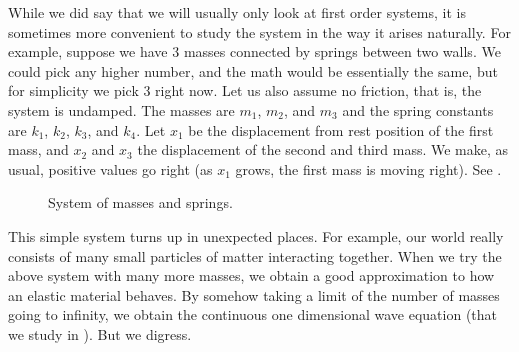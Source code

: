 \documentclass[12pt]{book}
\begin{document}
While we did say that we will usually only look at first order systems, it is
sometimes more convenient to study the system in the way it arises naturally.
For example, suppose we have 3 masses connected by springs between two
walls.  We could pick any higher number, and the math would be essentially
the same, but for simplicity we pick 3 right now.  Let us also assume no
friction, that is, the system is undamped.
The masses are $m_1$, $m_2$, and
$m_3$ and the spring constants are $k_1$, $k_2$, $k_3$, and $k_4$.
Let $x_1$ be the displacement from rest position of the first mass, and
$x_2$ and $x_3$ the displacement of the second and third mass.  We make,
as usual, positive values go right (as $x_1$ grows, the first mass is
moving right).
See .

\begin{figure}[h!t]
\capstart
\begin{center}
\caption{System of masses and springs.\label{sosa:threecartsfig}}
\end{center}
\end{figure}

This simple system turns up in unexpected places.  For example, 
our world really consists of many small particles of matter interacting together.
When we try the above system with many more masses, we obtain a good approximation to
how an elastic material behaves.  By somehow taking a limit of
the number of masses going to infinity, we obtain the continuous one
dimensional wave equation (that we study in ).
But we digress.
\end{document}
